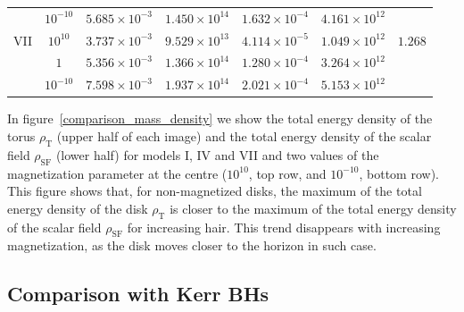 \documentclass[twocolumn,aps,showpacs,showkeys,prd,superscriptaddress,byrevtex, amsmath]{revtex4-1}
\begin{document}
\begin{table}[t]
\begin{tabular}{c c c c c c c}
  & $10^{-10}$ & $5.685 \times 10^{-3}$ & $1.450 \times 10^{14}$ & $1.632 \times 10^{-4}$ & $4.161 \times 10^{12}$ & \\ 

VII  & $10^{10}$ & $3.737 \times 10^{-3}$ & $9.529 \times 10^{13}$ & $4.114 \times 10^{-5}$ & $1.049 \times 10^{12}$ & $1.268$\\ 

  & $1$ & $5.356 \times 10^{-3}$ & $1.366 \times 10^{14}$ & $1.280 \times 10^{-4}$ & $3.264 \times 10^{12}$ & \\ 

  & $10^{-10}$ & $7.598 \times 10^{-3}$ & $1.937 \times 10^{14}$ & $2.021 \times 10^{-4}$ & $5.153 \times 10^{12}$ & \\ 
 \hline\hline   
\end{tabular}
\end{table}

In figure~\ref{comparison_mass_density} we show the total energy density of the torus $\rho_{\mathrm{T}}$ (upper half of each image) and the total energy density of the scalar field $\rho_{\mathrm{SF}}$ (lower half) for models I, IV and VII and two  values of the magnetization parameter at the centre ($10^{10}$, top row, and $10^{-10}$, bottom row). This figure shows that, for non-magnetized disks, the maximum of the total energy density of the disk $\rho_{\mathrm{T}}$ is closer to the maximum of the total energy density of the scalar field $\rho_{\mathrm{SF}}$ for increasing hair. This trend disappears with increasing magnetization, as the disk moves closer to the horizon in such case.

\subsection{Comparison with Kerr BHs}
\end{document}
